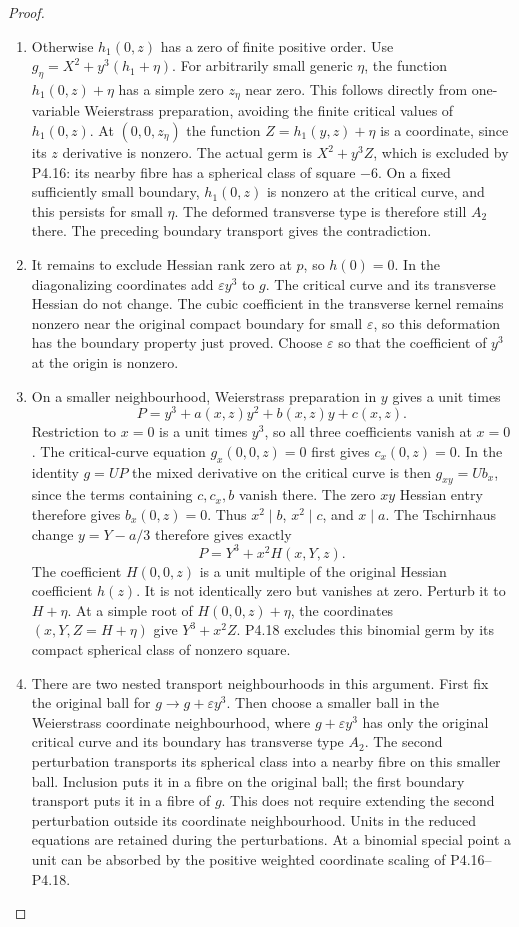 \begin{proof}
\begin{enumerate}[label={$\langle1\rangle$\arabic*.},leftmargin=*]
\item Otherwise $h_1(0,z)$ has a zero of
finite positive order. Use
$g_\eta=X^2+y^3(h_1+\eta)$.
For arbitrarily small generic $\eta$,
the function $h_1(0,z)+\eta$ has a
simple zero $z_\eta$ near zero.
This follows directly from one-variable
Weierstrass preparation, avoiding the
finite critical values of $h_1(0,z)$.
At $(0,0,z_\eta)$ the function
$Z=h_1(y,z)+\eta$ is a coordinate,
since its $z$ derivative is nonzero.
The actual germ is
$X^2+y^3Z$, which is excluded by
P4.16: its nearby fibre has a
spherical class of square $-6$.
On a fixed sufficiently small boundary,
$h_1(0,z)$ is nonzero at the critical
curve, and this persists for small
$\eta$. The deformed transverse type
is therefore still $A_2$ there.
The preceding boundary transport gives
the contradiction.

\item It remains to exclude Hessian rank
zero at $p$, so $h(0)=0$. In the
diagonalizing coordinates add
$\varepsilon y^3$ to $g$. The
critical curve and its transverse
Hessian do not change. The cubic
coefficient in the transverse kernel
remains nonzero near the original
compact boundary for small
$\varepsilon$, so this deformation
has the boundary property just proved.
Choose $\varepsilon$ so that the
coefficient of $y^3$ at the origin
is nonzero.

\item On a smaller neighbourhood, Weierstrass
preparation in $y$ gives a unit times
\[
 P=y^3+a(x,z)y^2+b(x,z)y+c(x,z).
\]
Restriction to $x=0$ is a unit times
$y^3$, so all three coefficients
vanish at $x=0$. The critical-curve
equation $g_x(0,0,z)=0$ first gives
$c_x(0,z)=0$. In the identity
$g=U P$ the mixed derivative on
the critical curve is then
$g_{xy}=U b_x$, since the terms
containing $c,c_x,b$ vanish there.
The zero $xy$ Hessian entry therefore
gives $b_x(0,z)=0$. Thus
$x^2\mid b$, $x^2\mid c$, and
$x\mid a$.
The Tschirnhaus change $y=Y-a/3$
therefore gives exactly
\[
 P=Y^3+x^2H(x,Y,z).
\]
The coefficient $H(0,0,z)$ is a unit
multiple of the original Hessian
coefficient $h(z)$. It is not
identically zero but vanishes at
zero. Perturb it to $H+\eta$.
At a simple root of
$H(0,0,z)+\eta$, the coordinates
$(x,Y,Z=H+\eta)$ give
$Y^3+x^2Z$. P4.18 excludes this
binomial germ by its compact
spherical class of nonzero square.

\item There are two nested transport
neighbourhoods in this argument.
First fix the original ball for
$g\to g+\varepsilon y^3$.
Then choose a smaller ball in the
Weierstrass coordinate neighbourhood,
where $g+\varepsilon y^3$ has only
the original critical curve and its
boundary has transverse type $A_2$.
The second perturbation transports
its spherical class into a nearby
fibre on this smaller ball. Inclusion
puts it in a fibre on the original
ball; the first boundary transport
puts it in a fibre of $g$.
This does not require extending the
second perturbation outside its
coordinate neighbourhood.
Units in the reduced equations are
retained during the perturbations.
At a binomial special point a unit
can be absorbed by the positive
weighted coordinate scaling of
P4.16--P4.18.


\end{enumerate}
\end{proof}
